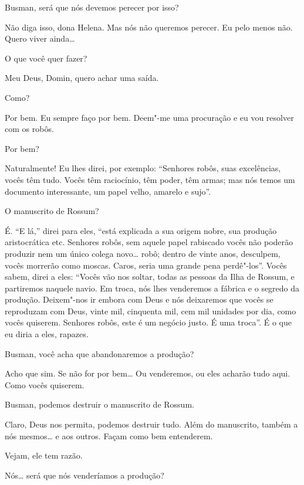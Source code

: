  Busman, será que nós devemos perecer por isso?

 Não diga isso, dona Helena. Mas nós não queremos perecer. Eu pelo menos
não. Quero viver ainda\ldots{}

 O que você quer fazer?

 Meu Deus, Domin, quero achar uma saída.

  Como?

 Por bem. Eu sempre faço por bem. Deem"-me uma procuração e eu vou
resolver com os robôs.

 Por bem?

 Naturalmente! Eu lhes direi, por exemplo: ``Senhores robôs, suas
excelências, vocês têm tudo. Vocês têm raciocínio, têm poder, têm armas; mas nós
temos um documento interessante, um papel velho, amarelo e sujo''.

 O manuscrito de Rossum?

 É. ``E lá,'' direi para eles, ``está explicada a sua origem nobre, sua
produção aristocrática etc. Senhores robôs, sem aquele papel rabiscado vocês
não poderão produzir nem um único colega novo\ldots{} robô; dentro de vinte anos,
desculpem, vocês morrerão como moscas. Caros, seria uma grande pena
perdê"-los''. Vocês sabem, direi a eles: ``Vocês vão nos soltar, todas as pessoas da
Ilha de Rossum, e partiremos naquele navio. Em troca, nós lhes venderemos a
fábrica e o segredo da produção. Deixem"-nos ir embora com Deus e nós 
deixaremos que vocês se reproduzam com Deus, vinte mil, cinquenta mil, cem mil unidades por
dia, como vocês quiserem. Senhores robôs, este é um negócio justo. É uma
troca''. É o que eu diria a eles, rapazes.

 Busman, você acha que abandonaremos a produção?

 Acho que sim. Se não for por bem\ldots{} Ou venderemos, ou
eles acharão tudo aqui. Como vocês quiserem.

 Busman, podemos destruir o manuscrito de Rossum.

 Claro, Deus nos permita, podemos destruir tudo. Além do manuscrito,
também a nós mesmos\ldots{} e aos outros. Façam como bem entenderem.

  Vejam, ele tem razão.

 Nós\ldots{} será que nós venderíamos a produção?

